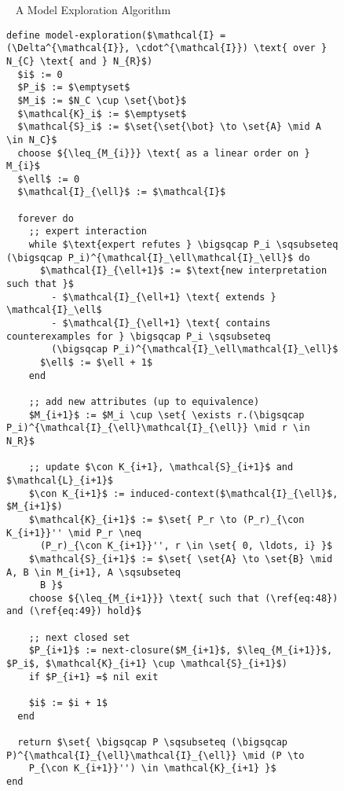 \begin{figure}[tp]
  \begin{Algorithm}~ A Model Exploration Algorithm%
    \label{alg:model-exploration}
    \begin{lstlisting}
define model-exploration($\mathcal{I} = (\Delta^{\mathcal{I}}, \cdot^{\mathcal{I}}) \text{ over } N_{C} \text{ and } N_{R}$)
  $i$ := 0
  $P_i$ := $\emptyset$
  $M_i$ := $N_C \cup \set{\bot}$
  $\mathcal{K}_i$ := $\emptyset$
  $\mathcal{S}_i$ := $\set{\set{\bot} \to \set{A} \mid A \in N_C}$
  choose ${\leq_{M_{i}}} \text{ as a linear order on } M_{i}$
  $\ell$ := 0
  $\mathcal{I}_{\ell}$ := $\mathcal{I}$
  
  forever do
    ;; expert interaction
    while $\text{expert refutes } \bigsqcap P_i \sqsubseteq (\bigsqcap P_i)^{\mathcal{I}_\ell\mathcal{I}_\ell}$ do
      $\mathcal{I}_{\ell+1}$ := $\text{new interpretation such that }$
        - $\mathcal{I}_{\ell+1} \text{ extends } \mathcal{I}_\ell$
        - $\mathcal{I}_{\ell+1} \text{ contains counterexamples for } \bigsqcap P_i \sqsubseteq
        (\bigsqcap P_i)^{\mathcal{I}_\ell\mathcal{I}_\ell}$
      $\ell$ := $\ell + 1$
    end

    ;; add new attributes (up to equivalence)
    $M_{i+1}$ := $M_i \cup \set{ \exists r.(\bigsqcap P_i)^{\mathcal{I}_{\ell}\mathcal{I}_{\ell}} \mid r \in N_R}$

    ;; update $\con K_{i+1}, \mathcal{S}_{i+1}$ and $\mathcal{L}_{i+1}$
    $\con K_{i+1}$ := induced-context($\mathcal{I}_{\ell}$, $M_{i+1}$)
    $\mathcal{K}_{i+1}$ := $\set{ P_r \to (P_r)_{\con K_{i+1}}'' \mid P_r \neq
      (P_r)_{\con K_{i+1}}'', r \in \set{ 0, \ldots, i} }$
    $\mathcal{S}_{i+1}$ := $\set{ \set{A} \to \set{B} \mid A, B \in M_{i+1}, A \sqsubseteq
      B }$
    choose ${\leq_{M_{i+1}}} \text{ such that (\ref{eq:48}) and (\ref{eq:49}) hold}$

    ;; next closed set
    $P_{i+1}$ := next-closure($M_{i+1}$, $\leq_{M_{i+1}}$, $P_i$, $\mathcal{K}_{i+1} \cup \mathcal{S}_{i+1}$)
    if $P_{i+1} =$ nil exit

    $i$ := $i + 1$
  end

  return $\set{ \bigsqcap P \sqsubseteq (\bigsqcap P)^{\mathcal{I}_{\ell}\mathcal{I}_{\ell}} \mid (P \to
    P_{\con K_{i+1}}'') \in \mathcal{K}_{i+1} }$
end    
    \end{lstlisting}  
  \end{Algorithm}
\end{figure}

